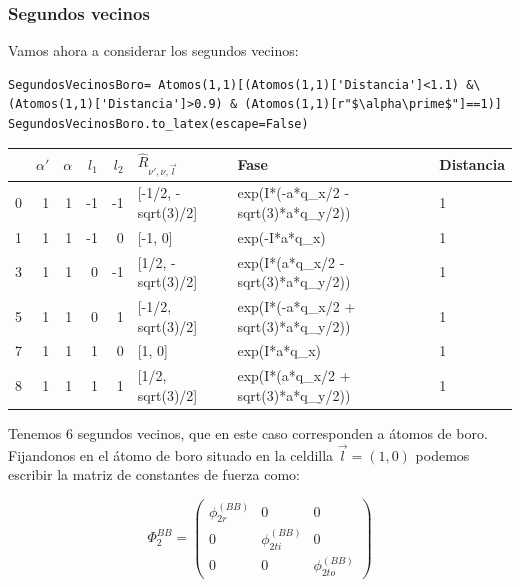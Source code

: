 \documentclass[12pt,a4paper]{article}
\begin{document}
\subsubsection{Segundos vecinos}
\label{sec:org0d99195}

Vamos ahora a considerar los segundos vecinos:

\begin{verbatim}
SegundosVecinosBoro= Atomos(1,1)[(Atomos(1,1)['Distancia']<1.1) &\
(Atomos(1,1)['Distancia']>0.9) & (Atomos(1,1)[r"$\alpha\prime$"]==1)]
SegundosVecinosBoro.to_latex(escape=False)
\end{verbatim}

\begin{tabular}{lrrrrlll}
\toprule
{} &  $\alpha\prime$ &  $\alpha$ &  $l_1$ &  $l_2$ & $\hat R_{\nu\prime,\nu,\vec l}$ &                                 Fase & Distancia \\
\midrule
0 &               1 &         1 &     -1 &     -1 &              [-1/2, -sqrt(3)/2] &  exp(I*(-a*q_x/2 - sqrt(3)*a*q_y/2)) &         1 \\
1 &               1 &         1 &     -1 &      0 &                         [-1, 0] &                        exp(-I*a*q_x) &         1 \\
3 &               1 &         1 &      0 &     -1 &               [1/2, -sqrt(3)/2] &   exp(I*(a*q_x/2 - sqrt(3)*a*q_y/2)) &         1 \\
5 &               1 &         1 &      0 &      1 &               [-1/2, sqrt(3)/2] &  exp(I*(-a*q_x/2 + sqrt(3)*a*q_y/2)) &         1 \\
7 &               1 &         1 &      1 &      0 &                          [1, 0] &                         exp(I*a*q_x) &         1 \\
8 &               1 &         1 &      1 &      1 &                [1/2, sqrt(3)/2] &   exp(I*(a*q_x/2 + sqrt(3)*a*q_y/2)) &         1 \\
\bottomrule
\end{tabular}



Tenemos \(6\) segundos vecinos, que en este caso corresponden a átomos de boro. Fijandonos en el átomo de boro situado en la celdilla \(\vec l=(1,0)\) podemos escribir la matriz de constantes de fuerza como:

\begin{equation}
\Phi_2^{BB}=\begin{pmatrix}
\phi_{2r}^{(BB)} & 0 & 0 \\
0 & \phi_{2ti}^{(BB)} & 0 \\
 0 & 0  & \phi_{2to}^{(BB)}
\end{pmatrix}
\end{equation} 
\end{document}
